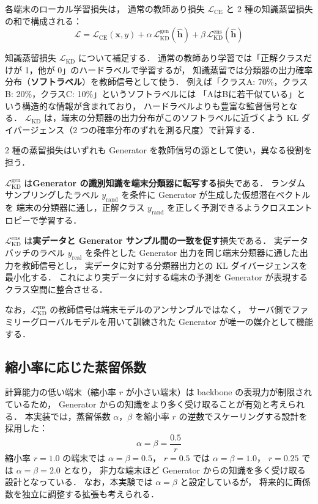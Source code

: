 各端末のローカル学習損失は，
通常の教師あり損失 $\mathcal{L}_{\mathrm{CE}}$ と 2 種の知識蒸留損失の和で構成される：
\begin{equation}
  \mathcal{L} = \mathcal{L}_{\mathrm{CE}}(\mathbf{x}, y)
              + \alpha \, \mathcal{L}_{\mathrm{KD}}^{\mathrm{gen}}(\hat{\mathbf{h}})
              + \beta  \, \mathcal{L}_{\mathrm{KD}}^{\mathrm{ens}}(\hat{\mathbf{h}})
  \label{eq:loss}
\end{equation}

知識蒸留損失 $\mathcal{L}_{\mathrm{KD}}$ について補足する．
通常の教師あり学習では「正解クラスだけが 1，他が 0」のハードラベルで学習するが，
知識蒸留では分類器の出力確率分布（\textbf{ソフトラベル}）を教師信号として使う．
例えば「クラスA: 70\%，クラスB: 20\%，クラスC: 10\%」というソフトラベルには
「AはBに若干似ている」という構造的な情報が含まれており，
ハードラベルよりも豊富な監督信号となる．
$\mathcal{L}_{\mathrm{KD}}$ は，端末の分類器の出力分布がこのソフトラベルに近づくよう
KL ダイバージェンス（2 つの確率分布のずれを測る尺度）で計算する．

2 種の蒸留損失はいずれも Generator を教師信号の源として使い，異なる役割を担う．

$\mathcal{L}_{\mathrm{KD}}^{\mathrm{gen}}$ は\textbf{Generator の識別知識を端末分類器に転写する}損失である．
ランダムサンプリングしたラベル $y_\mathrm{rand}$ を条件に Generator が生成した仮想潜在ベクトルを
端末の分類器に通し，正解クラス $y_\mathrm{rand}$ を正しく予測できるようクロスエントロピーで学習する．

$\mathcal{L}_{\mathrm{KD}}^{\mathrm{ens}}$ は\textbf{実データと Generator サンプル間の一致を促す}損失である．
実データバッチのラベル $y_\mathrm{real}$ を条件とした Generator 出力を同じ端末分類器に通した出力を教師信号とし，
実データに対する分類器出力との KL ダイバージェンスを最小化する．
これにより実データに対する端末の予測を Generator が表現するクラス空間に整合させる．

なお，$\mathcal{L}_{\mathrm{KD}}^{\mathrm{ens}}$ の教師信号は端末モデルのアンサンブルではなく，
サーバ側でファミリーグローバルモデルを用いて訓練された Generator が唯一の媒介として機能する．

\subsection{縮小率に応じた蒸留係数}

計算能力の低い端末（縮小率 $r$ が小さい端末）は backbone の表現力が制限されているため，
Generator からの知識をより多く受け取ることが有効と考えられる．
本実装では，蒸留係数 $\alpha$，$\beta$ を縮小率 $r$ の逆数でスケーリングする設計を採用した：
\begin{equation}
  \alpha = \beta = \frac{0.5}{r}
  \label{eq:kd_coeff}
\end{equation}
縮小率 $r = 1.0$ の端末では $\alpha = \beta = 0.5$，
$r = 0.5$ では $\alpha = \beta = 1.0$，
$r = 0.25$ では $\alpha = \beta = 2.0$ となり，
非力な端末ほど Generator からの知識を多く受け取る設計となっている．
なお，本実験では $\alpha = \beta$ と設定しているが，
将来的に両係数を独立に調整する拡張も考えられる．

